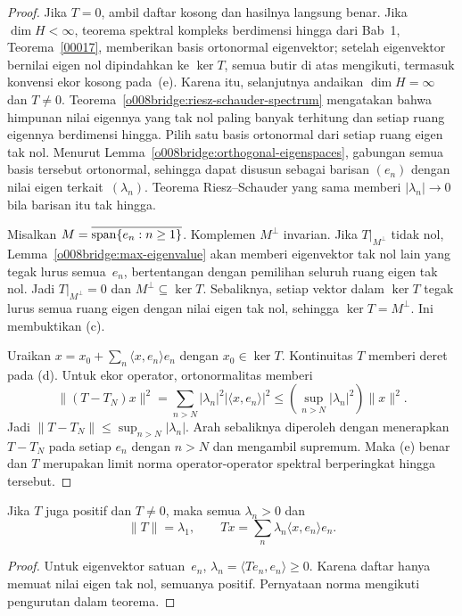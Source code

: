 \begin{proof}
Jika $T=0$, ambil daftar kosong dan hasilnya langsung benar. Jika
$\dim H<\infty$, teorema spektral kompleks berdimensi hingga dari
Bab~1, Teorema~\ref{00017}, memberikan basis ortonormal eigenvektor; setelah
eigenvektor bernilai eigen nol dipindahkan ke $\ker T$, semua butir di atas
mengikuti, termasuk konvensi ekor kosong pada~(e). Karena itu, selanjutnya
andaikan $\dim H=\infty$ dan $T\neq0$.
Teorema~\ref{o008bridge:riesz-schauder-spectrum} mengatakan bahwa himpunan
nilai eigennya yang tak nol paling banyak terhitung dan setiap ruang eigennya
berdimensi hingga. Pilih satu basis ortonormal dari setiap ruang eigen tak nol.
Menurut Lemma~\ref{o008bridge:orthogonal-eigenspaces}, gabungan semua basis
tersebut ortonormal, sehingga dapat disusun sebagai barisan $(e_n)$ dengan
nilai eigen terkait~$(\lambda_n)$. Teorema Riesz--Schauder yang sama memberi
$|\lambda_n|\to0$ bila barisan itu tak hingga.

Misalkan $M=\overline{\operatorname{span}\{e_n:n\geq1\}}$. Komplemen $M^\perp$ invarian. Jika
$T|_{M^\perp}$ tidak nol, Lemma~\ref{o008bridge:max-eigenvalue} akan memberi
eigenvektor tak nol lain yang tegak lurus semua~$e_n$, bertentangan dengan
pemilihan seluruh ruang eigen tak nol. Jadi $T|_{M^\perp}=0$ dan
$M^\perp\subseteq\ker T$. Sebaliknya, setiap vektor dalam $\ker T$ tegak
lurus semua ruang eigen dengan nilai eigen tak nol, sehingga
$\ker T=M^\perp$. Ini membuktikan (c).

Uraikan $x=x_0+\sum_n\langle x,e_n\rangle e_n$ dengan
$x_0\in\ker T$. Kontinuitas $T$ memberi deret pada (d). Untuk ekor operator,
ortonormalitas memberi
\[
 \|(T-T_N)x\|^2
 =\sum_{n>N}|\lambda_n|^2|\langle x,e_n\rangle|^2
 \leq\left(\sup_{n>N}|\lambda_n|^2\right)\|x\|^2.
\]
Jadi $\|T-T_N\|\leq\sup_{n>N}|\lambda_n|$. Arah sebaliknya diperoleh dengan
menerapkan $T-T_N$ pada setiap $e_n$ dengan $n>N$ dan mengambil supremum.
Maka (e) benar dan $T$ merupakan limit norma operator-operator spektral
berperingkat hingga tersebut.
\end{proof}

\begin{cor}\label{o008bridge:positive-compact-spectral}
Jika $T$ juga positif dan $T\neq0$, maka semua $\lambda_n>0$ dan
\[
 \|T\|=\lambda_1,
 \qquad
 Tx=\sum_n\lambda_n\langle x,e_n\rangle e_n.
\]
\end{cor}

\begin{proof}
Untuk eigenvektor satuan~$e_n$,
$\lambda_n=\langle Te_n,e_n\rangle\geq0$. Karena daftar hanya memuat nilai
eigen tak nol, semuanya positif. Pernyataan norma mengikuti pengurutan dalam
teorema.
\end{proof}


